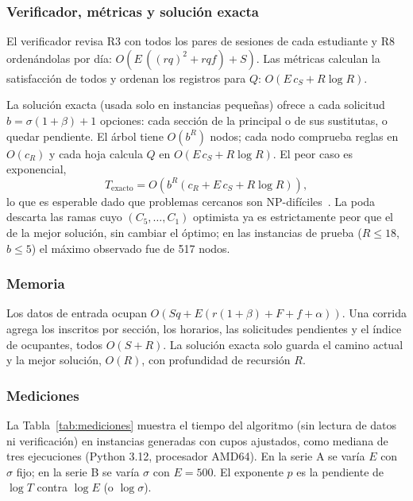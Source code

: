\subsubsection{Verificador, métricas y solución exacta}

El verificador revisa R3 con todos los pares de sesiones de cada estudiante y R8 ordenándolas por día: $O\!\left(E\,((rq)^2 + rqf) + S\right)$. Las métricas calculan la satisfacción de todos y ordenan los registros para $Q$: $O(E\,c_S + R \log R)$.

La solución exacta (usada solo en instancias pequeñas) ofrece a cada solicitud $b = \sigma(1+\beta) + 1$ opciones: cada sección de la principal o de sus sustitutas, o quedar pendiente. El árbol tiene $O(b^R)$ nodos; cada nodo comprueba reglas en $O(c_R)$ y cada hoja calcula $Q$ en $O(E\,c_S + R \log R)$. El peor caso es exponencial,
\[
T_{\mathrm{exacto}} = O\!\left(b^R \left(c_R + E\,c_S + R\log R\right)\right),
\]
lo que es esperable dado que problemas cercanos son NP-difíciles~\cite{spieksma1999}. La poda descarta las ramas cuyo $(C_5,\dots,C_1)$ optimista ya es estrictamente peor que el de la mejor solución, sin cambiar el óptimo; en las instancias de prueba ($R \le 18$, $b \le 5$) el máximo observado fue de 517 nodos.

\subsubsection{Memoria}

Los datos de entrada ocupan $O(Sq + E(r(1+\beta) + F + f + \alpha))$. Una corrida agrega los inscritos por sección, los horarios, las solicitudes pendientes y el índice de ocupantes, todos $O(S + R)$. La solución exacta solo guarda el camino actual y la mejor solución, $O(R)$, con profundidad de recursión $R$.

\subsubsection{Mediciones}

La Tabla~\ref{tab:mediciones} muestra el tiempo del algoritmo (sin lectura de datos ni verificación) en instancias generadas con cupos ajustados, como mediana de tres ejecuciones (Python 3.12, procesador AMD64). En la serie A se varía $E$ con $\sigma$ fijo; en la serie B se varía $\sigma$ con $E = 500$. El exponente $p$ es la pendiente de $\log T$ contra $\log E$ (o $\log \sigma$).


